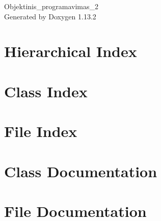 \documentclass[twoside]{book}
\newcommand{\+}{\discretionary{\mbox{\scriptsize$\hookleftarrow$}}{}{}}
\newcommand{\clearemptydoublepage}{%
    \newpage{\pagestyle{empty}\cleardoublepage}%
  }
\begin{document}
  \raggedbottom
    \hypersetup{pageanchor=false,
                bookmarksnumbered=true,
                pdfencoding=unicode
               }
  \begin{titlepage}
  \vspace*{7cm}
  \begin{center}%
  {\Large Objektinis\+\_\+programavimas\+\_\+2}\\
  \vspace*{1cm}
  {\large Generated by Doxygen 1.13.2}\\
  \end{center}
  \end{titlepage}
  \clearemptydoublepage
  \tableofcontents
  \clearemptydoublepage
  \hypersetup{pageanchor=true}

\chapter{Hierarchical Index}

\chapter{Class Index}

\chapter{File Index}

\chapter{Class Documentation}



\chapter{File Documentation}
















  \backmatter
  \newpage
  \clearemptydoublepage
  \printindex
\end{document}
